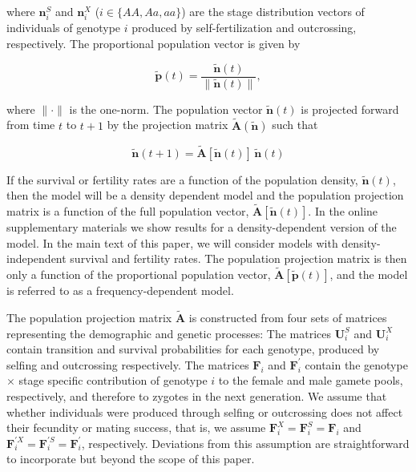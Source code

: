 \documentclass[11pt]{article}
\def\mbf#1{\mathbf{#1}}
\begin{document}
\noindent where $\mbf{n}^{S}_{i}$ and $\mbf{n}^{X}_{i}$ ($i \in \{AA,Aa,aa\}$) are the stage distribution vectors of individuals of genotype $i$ produced by self-fertilization and outcrossing, respectively. The proportional population vector is given by
\begin{linenomath*}
\begin{equation} \label{eq:propPopVec}
	\tilde{\mbf{p}}(t) = \frac{\tilde{\mbf{n}}(t)}{ \| \tilde{\mbf{n}}(t) \|},
\end{equation}
\end{linenomath*}

\noindent where $\| \cdot \|$ is the one-norm. The population vector $\tilde{\mbf{n}}(t)$ is projected forward from time $t$ to $t + 1$ by the projection matrix $\tilde{\mbf{A}}(\tilde{\mbf{n}})$ such that 
\begin{linenomath*}
\begin{equation}
	\tilde{\mbf{n}}(t + 1) = \tilde{\mbf{A}}[\tilde{\mbf{n}}(t)] \, \tilde{\mbf{n}}(t)
\end{equation}
\end{linenomath*}
If the survival or fertility rates are a function of the population density, $\tilde{\mbf{n}}(t)$, then the model will be a density dependent model and the population projection matrix is a function of the full population vector, $\tilde{\mbf{A}}[\tilde{\mbf{n}}(t)]$. In the online supplementary materials we show results for a density-dependent version of the model. In the main text of this paper, we will consider models with density-independent survival and fertility rates. The population projection matrix is then only a function of the proportional population vector, $\tilde{\mbf{A}}[\tilde{\mbf{p}}(t)]$, and the model is referred to as a frequency-dependent model.


The population projection matrix $\tilde{\mbf{A}}$ is constructed from four sets of matrices representing the demographic and genetic processes: The matrices $\mbf{U}^{S}_{i}$ and $\mbf{U}^{X}_{i}$ contain transition and survival probabilities for each genotype, produced by selfing and outcrossing respectively. The matrices $\mbf{F}_{i}$ and $\mbf{F}^{\prime}_{i}$ contain the genotype $\times$ stage specific contribution of genotype $i$ to the female and male gamete pools, respectively, and therefore to zygotes in the next generation. We assume that whether individuals were produced through selfing or outcrossing does not affect their fecundity or mating success, that is, we assume  $\mbf{F}^X_{i}=\mbf{F}^S_{i}=\mbf{F}_{i}$ and $\mbf{F}^{\prime X}_{i}=\mbf{F}^{\prime S}_{i}=\mbf{F}^{\prime}_{i}$, respectively. Deviations from this assumption are straightforward to incorporate but beyond the scope of this paper. 
\end{document}
